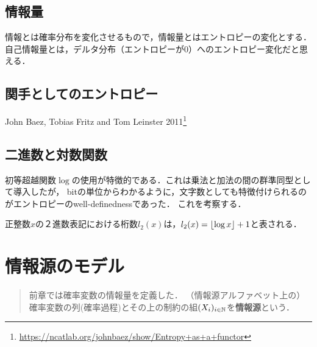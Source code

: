\documentclass[uplatex,dvipdfmx]{jsreport}
\begin{document}
\section{情報量}

\begin{tcolorbox}[colframe=ForestGreen, colback=ForestGreen!10!white,breakable,colbacktitle=ForestGreen!40!white,coltitle=black,fonttitle=\bfseries\sffamily,
title=]
    情報とは確率分布を変化させるもので，情報量とはエントロピーの変化とする．
    自己情報量とは，デルタ分布（エントロピーが$0$）へのエントロピー変化だと思える．
\end{tcolorbox}

\section{関手としてのエントロピー}

\begin{tcolorbox}[colframe=ForestGreen, colback=ForestGreen!10!white,breakable,colbacktitle=ForestGreen!40!white,coltitle=black,fonttitle=\bfseries\sffamily,
title=]
    John Baez, Tobias Fritz and Tom Leinster 2011\footnote{\url{https://ncatlab.org/johnbaez/show/Entropy+as+a+functor}}
\end{tcolorbox}

\section{二進数と対数関数}

\begin{tcolorbox}[colframe=ForestGreen, colback=ForestGreen!10!white,breakable,colbacktitle=ForestGreen!40!white,coltitle=black,fonttitle=\bfseries\sffamily,
title=エントロピーの特徴付け]
    初等超越関数$\log$の使用が特徴的である．これは乗法と加法の間の群準同型として導入したが，
    bitの単位からわかるように，文字数としても特徴付けられるのがエントロピーのwell-definednessであった．
    これを考察する．
\end{tcolorbox}

\begin{proposition}
    正整数$x$の２進数表記における桁数$l_2(x)$は，$l_2(x)=\lfloor\log x\rfloor+1$と表される．
\end{proposition}

\chapter{情報源のモデル}

\begin{quotation}
    前章では確率変数の情報量を定義した．
    （情報源アルファベット上の）確率変数の列(確率過程)とその上の制約の組$(X_i)_{i\in\mathbb{N}}$を\textbf{情報源}という．
\end{quotation}
\end{document}
